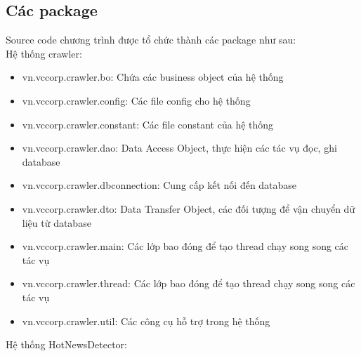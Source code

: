 	\subsection{Các package}
	Source code chương trình được tổ chức thành các package như sau:\\
	Hệ thống crawler:
	\begin{itemize}
		\item vn.vccorp.crawler.bo: Chứa các business object của hệ thống
		\item vn.vccorp.crawler.config: Các file config cho hệ thống
		\item vn.vccorp.crawler.constant: Các file constant của hệ thống
		\item vn.vccorp.crawler.dao: Data Access Object, thực hiện các tác vụ đọc, ghi database
		\item vn.vccorp.crawler.dbconnection: Cung cấp kết nối đến database
		\item vn.vccorp.crawler.dto: Data Transfer Object, các đối tượng để vận chuyển dữ liệu từ database
		\item vn.vccorp.crawler.main: Các lớp bao đóng để tạo thread chạy song song các tác vụ
		\item vn.vccorp.crawler.thread: Các lớp bao đóng để tạo thread chạy song song các tác vụ
		\item vn.vccorp.crawler.util: Các công cụ hỗ trợ trong hệ thống
	\end{itemize}
	Hệ thống HotNewsDetector:
